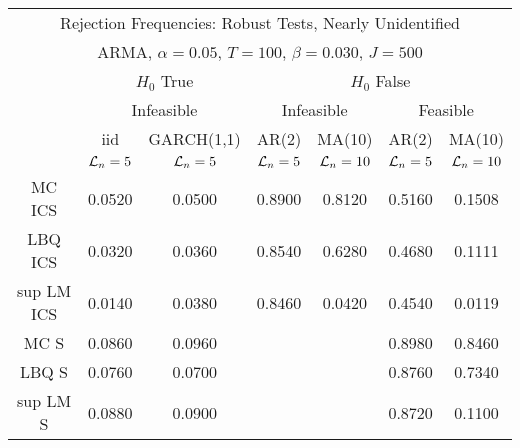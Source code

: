  \begin{table}[H] 
 \tiny 
 \centering 
\begin{tabular}{|c|c|c||c|c|c|c|} 
\multicolumn{7}{c}{ Rejection Frequencies: Robust Tests, Nearly Unidentified } \\ 
\multicolumn{7}{c}{ ARMA, $\alpha = 0.05$, $T=100$, $\beta = 0.030$, $J=500$ } \\ 
  \multicolumn{1}{c}{ } & \multicolumn{2}{c}{ $H_{0}$ True} & \multicolumn{4}{c}{ $H_{0}$ False} \\ 
  \multicolumn{1}{c}{ } & \multicolumn{2}{c}{ Infeasible } & \multicolumn{2}{c}{ Infeasible } & \multicolumn{2}{c}{ Feasible} \\ 
 \hline 
 & iid & GARCH(1,1) & AR(2) & MA(10) & AR(2) & MA(10)  \\ 
 & $\mathcal{L}_n=5$ & $\mathcal{L}_n=5$ & $\mathcal{L}_n=5$ & $\mathcal{L}_n=10$ & $\mathcal{L}_n=5$ & $\mathcal{L}_n=10$   \\ 
 \hline 
 MC ICS &  0.0520 &  0.0500 &  0.8900 &  0.8120 & 0.5160 &  0.1508 \\ 
 LBQ ICS &  0.0320 &  0.0360 &  0.8540 &  0.6280 & 0.4680 &  0.1111  \\ 
 sup LM ICS &  0.0140 &  0.0380 &  0.8460 &  0.0420 & 0.4540 &  0.0119  \\ 
 \hline 
 MC S &  0.0860 &  0.0960 & & &  0.8980 &  0.8460  \\ 
 LBQ S &  0.0760 &  0.0700 & & &  0.8760 &  0.7340  \\ 
 sup LM S &  0.0880 &  0.0900 & & &  0.8720 &  0.1100  \\ 
 \hline 
\end{tabular}
 \end{table}


